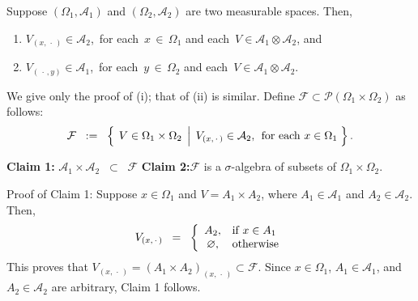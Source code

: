 \begin{theorem}
\label{SectionsOfMeasurableSetsAreMeasurable}
\mbox{}\vskip-0.3cm\noindent
Suppose
$\left(\Omega_{1},\mathcal{A}_{1}\right)$ and $\left(\Omega_{2},\mathcal{A}_{2}\right)$
are two measurable spaces. Then,
\begin{enumerate}
\item	$V_{(x,\,\cdot\,)} \in \mathcal{A}_{2}$,
		\,for each\, $x\,\in\,\Omega_{1}$ and each\, $V \in \mathcal{A}_{1}\otimes\mathcal{A}_{2}$, and
\item	$V_{(\,\cdot\,,y)} \in \mathcal{A}_{1}$,
		\,for each\, $y\,\in\,\Omega_{2}$ and each\, $V \in \mathcal{A}_{1}\otimes\mathcal{A}_{2}$.
\end{enumerate}
\end{theorem}
\proof
We give only the proof of (i); that of (ii) is similar.
Define $\mathcal{F} \subset \mathcal{P}\!\left(\Omega_{1}\times\Omega_{2}\right)$ as follows:
\begin{equation*}
\mathcal{F}
\;\; := \;\;
\left\{\;\left.
V \overset{{\color{white}.}}{\in} \Omega_{1}\times\Omega_{2}
\,\;\right\vert\;
V_{(x,\,\cdot\,)} \in \mathcal{A}_{2},\;\,\textnormal{for each $x\in\Omega_{1}$}
\;\right\}.
\end{equation*}
\begin{center}
\begin{minipage}{6.5in}
\noindent
\textbf{Claim 1:}\quad
	$\mathcal{A}_{1}\times\mathcal{A}_{2} \;\;\subset\;\; \mathcal{F}$
\vskip 0.5cm
\noindent
\textbf{Claim 2:}\quad $\mathcal{F}$ is a $\sigma$-algebra of subsets of $\Omega_{1}\times\Omega_{2}$.
\end{minipage}
\end{center}
\vskip 0.5cm
Proof of Claim 1:\quad
Suppose $x \in \Omega_{1}$ and
$V = A_{1} \times A_{2}$, where $A_{1} \in \mathcal{A}_{1}$ and $A_{2} \in \mathcal{A}_{2}$.
Then,
\begin{equation*}
V_{(x,\,\cdot\,)}
\;\; = \;\;
\left\{\begin{array}{cl}
A_{2}, & \textnormal{if $x \in A_{1}$} \\
\varnothing, & \textnormal{otherwise}
\end{array}\right.
\end{equation*}
This proves that $V_{(x,\,\cdot\,)} = (A_{1}\times A_{2})_{(x,\,\cdot\,)} \subset \mathcal{F}$.
Since $x \in \Omega_{1}$, $A_{1} \in \mathcal{A}_{1}$, and $A_{2} \in \mathcal{A}_{2}$ are arbitrary,
Claim 1 follows.

